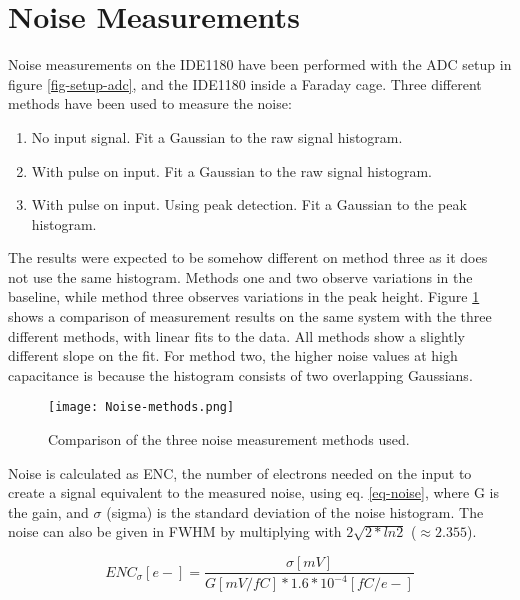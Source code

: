 \documentclass[../main/thesis.tex]{subfiles}
\begin{document}
\newpage
\section{Noise Measurements}
\label{ide-noise}

Noise measurements on the IDE1180 have been performed with the ADC setup in figure \ref{fig-setup-adc}, and the IDE1180 inside a Faraday cage. Three different methods have been used to measure the noise:
\begin{enumerate}  
	\item No input signal. Fit a Gaussian to the raw signal histogram. 
	\item With pulse on input. Fit a Gaussian to the raw signal histogram.  
	\item With pulse on input. Using peak detection. Fit a Gaussian to the peak histogram.   
\end{enumerate}

The results were expected to be somehow different on method three as it does not use the same histogram. Methods one and two observe variations in the baseline, while method three observes variations in the peak height. Figure \ref{fig-noise-methods} shows a comparison of measurement results on the same system with the three different methods, with linear fits to the data. All methods show a slightly different slope on the fit. For method two, the higher noise values at high capacitance is because the histogram consists of two overlapping Gaussians.  %

\begin{figure}[h!]   %
	\centering
	\texttt{[image: Noise-methods.png]}
	\caption{Comparison of the three noise measurement methods used.}
	\label{fig-noise-methods}
\end{figure} 

\newpage
Noise is calculated as \acrfull{ENC}, the number of electrons needed on the input to create a signal equivalent to the measured noise, using eq. \ref{eq-noise}, where G is the gain, and $\sigma$ (sigma) is the standard deviation of the noise histogram. The noise can also be given in \gls{FWHM} by multiplying with $2\sqrt{2*ln2}$ ($\approx 2.355$). 

\begin{equation}%
ENC_\sigma [e-] = \frac{\sigma [mV]}{G [mV/fC]*1.6*10^{-4} [fC/e-]}
\label{eq-noise}
\end{equation}
\end{document}
